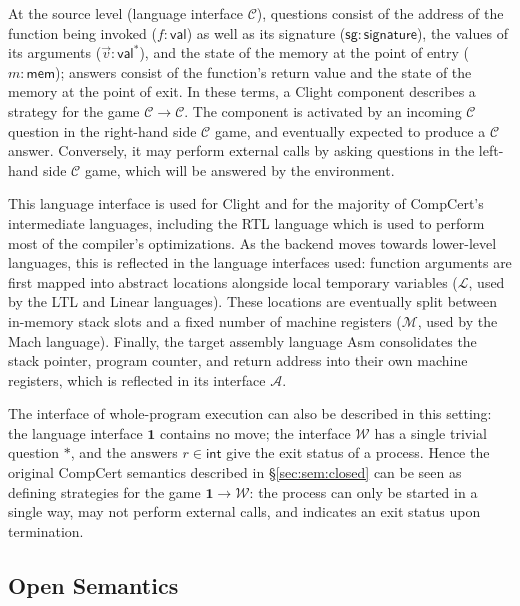 \documentclass[sigplan,10pt,review,anonymous]{acmart}
\newcommand{\kw}[1]{\ensuremath{ \mathsf{#1} }}
\begin{document}
At the source level (language interface $\mathcal{C}$),
questions consist of
the address of the function being invoked
($f : \kw{val}$)
as well as its signature
($\kw{sg} : \kw{signature}$),
the values of its arguments
($\vec{v} : \kw{val}^*$),
and the state of the memory at the point of entry
($m : \kw{mem}$);
answers
consist of the function's return value
and the state of the memory at the point of exit.
In these terms,
a Clight component describes a strategy for the game
$\mathcal{C} \rightarrow \mathcal{C}$.
The component is activated by an incoming $\mathcal{C}$ question
in the right-hand side $\mathcal{C}$ game,
and eventually expected to produce a $\mathcal{C}$ answer.
Conversely,
it may perform external calls by
asking questions in the left-hand side $\mathcal{C}$ game,
which will be answered by the environment.

This language interface is used for Clight and
for the majority of CompCert's intermediate languages,
including the RTL language which is used to perform
most of the compiler's optimizations.
As the backend moves towards lower-level languages,
this is reflected in the language interfaces used:
function arguments are first mapped into
abstract locations alongside local temporary variables
($\mathcal{L}$, used by the LTL and Linear languages).
These locations are eventually split between
in-memory stack slots and a fixed number of machine registers
($\mathcal{M}$, used by the Mach language).
Finally, the target assembly language Asm
consolidates the stack pointer, program counter,
and return address into their own machine registers,
which is reflected in its interface $\mathcal{A}$.

The interface of whole-program execution
can also be described in this setting:
the language interface $\mathbf{1}$ contains no move;
the interface $\mathcal{W}$ has a single trivial question $*$,
and the answers $r \in \kw{int}$
give the exit status of a process.
Hence the original CompCert semantics described in
\S\ref{sec:sem:closed}
can be seen as defining strategies for the game
$\mathbf{1} \rightarrow \mathcal{W}$:
the process can only be started in a single way,
may not perform external calls,
and indicates an exit status upon termination.


\subsection{Open Semantics} \label{sec:sem:open} %
\end{document}
